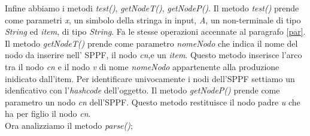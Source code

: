 Infine abbiamo i metodi \textit{test()}, \textit{getNodeT()}, \textit{getNodeP()}. Il metodo \textit{test()} prende come parametri \textit{x}, un simbolo della stringa in input, \textit{A}, un non-terminale di tipo \textit{String} ed \textit{item}, di tipo \textit{String}. Fa le stesse operazioni accennate al paragrafo \ref{par}. Il metodo \textit{getNodeT()} prende come parametro \textit{nomeNodo} che indica il nome del nodo da inserire nell' SPPF, il nodo \textit{cn},e un \textit{item}. Questo metodo inserisce l'arco tra il nodo \textit{cn} e il nodo \textit{v} di nome \textit{nomeNodo} appartenente alla produzione inidicato dall'item. Per identificare univocamente i nodi dell'SPPF settiamo un idenficativo con l'\textit{hashcode} dell'oggetto. Il metodo \textit{getNodeP()} prende come parametro un nodo \textit{cn} dell'SPPF. Questo metodo restituisce il nodo padre \textit{u} che ha per figlio il nodo \textit{cn}.\\
Ora analizziamo il metodo \textit{parse()};

